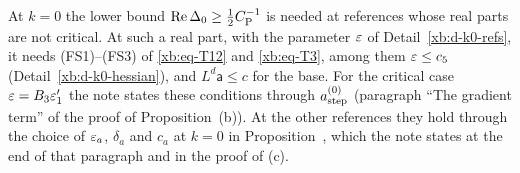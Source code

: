 \begin{detail}\label{xb:d-k0-thresholds}
At $k=0$ the lower bound $\operatorname{Re}\Delta_0\ge\frac12C_{\rm P}^{-1}$ is needed at references whose real parts are not critical. At such a real part, with the parameter $\varepsilon$ of Detail~\ref{xb:d-k0-refs}, it needs (FS1)--(FS3) of \eqref{xb:eq-T12} and \eqref{xb:eq-T3}, among them $\varepsilon\le c_5$ (Detail~\ref{xb:d-k0-hessian}), and $L^d\mathsf a\le c$ for the base. For the critical case $\varepsilon=B_3\varepsilon'_1$ the note states these conditions through $a^{(0)}_{\rm step}$ (paragraph ``The gradient term'' of the proof of Proposition~(b)). At the other references they hold through the choice of $\varepsilon_a$, $\delta_a$ and $c_a$ at $k=0$ in Proposition~, which the note states at the end of that paragraph and in the proof of (c).
\end{detail}

